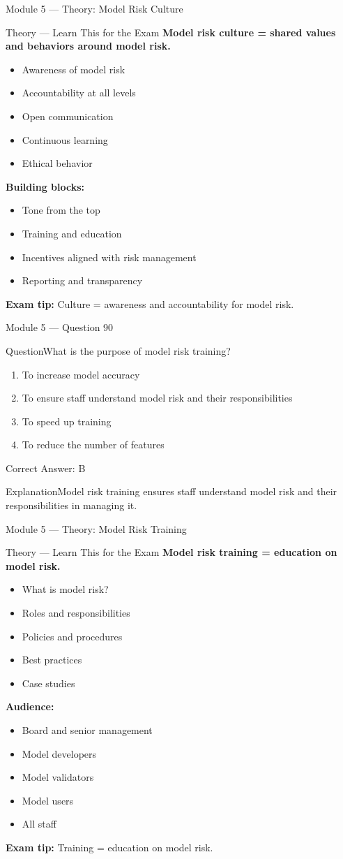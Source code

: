 \documentclass[aspectratio=169,10pt]{beamer}
\newcommand{\question}[1]{\begin{block}{Question}#1\end{block}}
\newcommand{\options}[4]{%
	\begin{enumerate}[label=\Alph*.,leftmargin=*]
		\item #1
		\item #2
		\item #3
		\item #4
	\end{enumerate}
}
\newcommand{\answerbox}[1]{\begin{exampleblock}{Correct Answer: #1}\end{exampleblock}}
\newcommand{\explain}[1]{\begin{block}{Explanation}#1\end{block}}
\newcommand{\theory}[1]{%
	\begin{block}{Theory --- Learn This for the Exam}
		\small #1
	\end{block}
}
\begin{document}
	\begin{frame}{Module 5 --- Theory: Model Risk Culture}
		\theory{
			\textbf{Model risk culture = shared values and behaviors around model risk.}
			\begin{itemize}
				\item Awareness of model risk
				\item Accountability at all levels
				\item Open communication
				\item Continuous learning
				\item Ethical behavior
			\end{itemize}
			\textbf{Building blocks:}
			\begin{itemize}
				\item Tone from the top
				\item Training and education
				\item Incentives aligned with risk management
				\item Reporting and transparency
			\end{itemize}
			\textbf{Exam tip:} Culture = awareness and accountability for model risk.
		}
	\end{frame}
	
	\begin{frame}{Module 5 --- Question 90}
		\question{What is the purpose of model risk training?}
		\options{To increase model accuracy}{To ensure staff understand model risk and their responsibilities}{To speed up training}{To reduce the number of features}
		\answerbox{B}
		\explain{Model risk training ensures staff understand model risk and their responsibilities in managing it.}
	\end{frame}
	
	\begin{frame}{Module 5 --- Theory: Model Risk Training}
		\theory{
			\textbf{Model risk training = education on model risk.}
			\begin{itemize}
				\item What is model risk?
				\item Roles and responsibilities
				\item Policies and procedures
				\item Best practices
				\item Case studies
			\end{itemize}
			\textbf{Audience:}
			\begin{itemize}
				\item Board and senior management
				\item Model developers
				\item Model validators
				\item Model users
				\item All staff
			\end{itemize}
			\textbf{Exam tip:} Training = education on model risk.
		}
	\end{frame}
	
\end{document}
